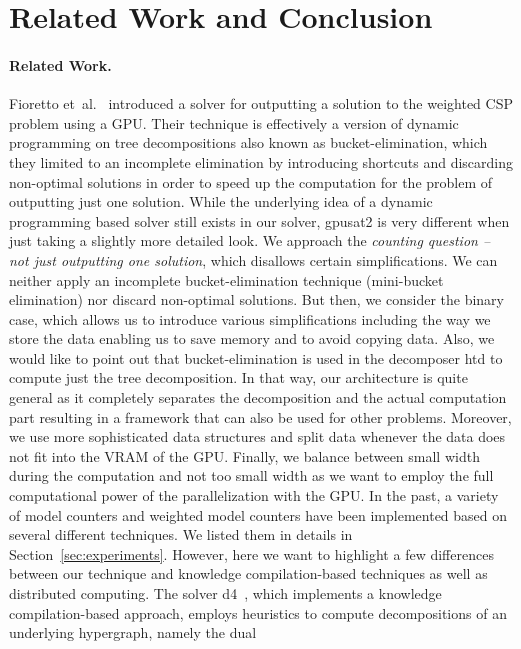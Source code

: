 \documentclass{llncs}
\makeatletter
\newcommand{\gpusatnu}{{\small\textsf{gpusat2}}\xspace}
\newcommand{\etal}{et~al.\@\xspace}
\makeatother
\begin{document}
\section{Related Work and Conclusion}
\paragraph*{Related Work.}
Fioretto \etal~\cite{FiorettoPontelliYeoh18} introduced a solver for
outputting a solution to the weighted CSP problem using a GPU. Their
technique is effectively a version of dynamic programming on tree
decompositions also known as bucket-elimination, which they limited to
an incomplete elimination by introducing shortcuts and discarding
non-optimal solutions in order to speed up the computation for the
problem of outputting just one solution. While the underlying idea of
a dynamic programming based solver still exists in our solver,
\gpusatnu is very different when just taking a slightly more detailed
look. We approach the \emph{counting question -- not just outputting
  one solution}, which disallows certain simplifications. We can
neither apply an incomplete bucket-elimination technique (mini-bucket
elimination) nor discard non-optimal solutions. But then, we consider
the binary case, which allows us to introduce various simplifications
including the way we store the data enabling us to save memory and to
avoid copying data.
  Also, we would like to point out that bucket-elimination is used in
  the decomposer htd to compute just the tree decomposition. In that
  way, our architecture is quite general as it completely separates the
  decomposition and the actual computation part resulting in a 
  framework that can also be used for other problems.
  Moreover, we use more sophisticated data structures and split data
  whenever the data does not fit into the VRAM of the GPU.
  Finally, we balance between small width during the computation and
  not too small width as we want to employ the full computational power
  of the parallelization with the GPU.
%
In the past, a variety of model counters and weighted model counters
have been implemented based on several different techniques. We listed
them in details in Section~\ref{sec:experiments}. However, here we
want to highlight a few differences between our technique and
knowledge compilation-based techniques as well as distributed
computing. The solver d4~\cite{LagniezMarquis17a}, which implements a
knowledge compilation-based approach, employs heuristics to compute
decompositions of an underlying hypergraph, namely the dual
\end{document}
